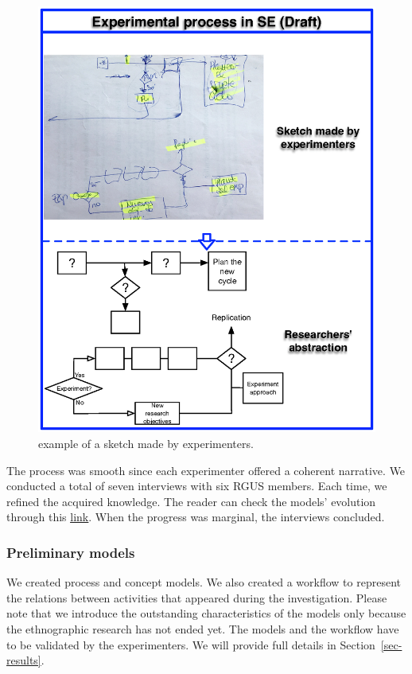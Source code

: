 \begin{figure}[htbp!]
	\centering
	\includegraphics[width=\columnwidth]{images/Process-Approximation-Draft}
	\caption{example of a sketch made by experimenters.}
	\label{fig-proceso-exp-boseto}
\end{figure}

The process was smooth since each experimenter offered a coherent narrative. We conducted a total of seven interviews with six RGUS members. Each time, we refined the acquired knowledge. The reader can check the models' evolution through this \href{https://zenodo.org/record/7102213#.YytmMezMLUI}{\ul{link}}. When the progress was marginal, the interviews concluded.

\subsubsection{Preliminary models}\label{sec:preliminary-models}
We created process and concept models. We also created a workflow to represent the relations between activities that appeared during the investigation. Please note that we introduce the outstanding characteristics of the models only because the ethnographic research has not ended yet. The models and the workflow have to be validated by the experimenters. We will provide full details in Section~\ref{sec-results}.

